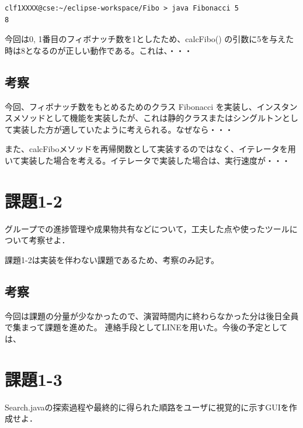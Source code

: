\documentclass{jarticle}
\begin{document}
\begin{lstlisting}
clf1XXXX@cse:~/eclipse-workspace/Fibo > java Fibonacci 5
8
\end{lstlisting}

今回は0, 1番目のフィボナッチ数を1としたため、calcFibo() の引数に5を与えた時は8となるのが正しい動作である。これは、・・・
\subsection{考察}
今回、フィボナッチ数をもとめるためのクラス Fibonacci を実装し、インスタンスメソッドとして機能を実装したが、これは静的クラスまたはシングルトンとして実装した方が適していたように考えられる。なぜなら・・・

また、calcFiboメソッドを再帰関数として実装するのではなく、イテレータを用いて実装した場合を考える。イテレータで実装した場合は、実行速度が・・・


\section{課題1-2}
\begin{screen}
  グループでの進捗管理や成果物共有などについて，工夫した点や使ったツールについて考察せよ．
\end{screen}

課題1-2は実装を伴わない課題であるため、考察のみ記す。

\subsection{考察}
  今回は課題の分量が少なかったので、演習時間内に終わらなかった分は後日全員で集まって課題を進めた。
  連絡手段としてLINEを用いた。今後の予定としては、


\section{課題1-3}
\begin{screen}
  Search.javaの探索過程や最終的に得られた順路をユーザに視覚的に示すGUIを作成せよ．
\end{screen}
\end{document}
